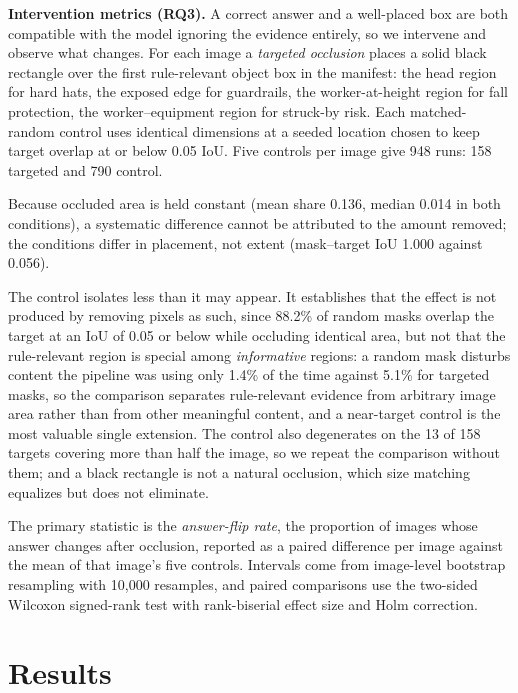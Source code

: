 \documentclass[12pt,letterpaper]{article}
\begin{document}
\label{sec:intervention}
\textbf{Intervention metrics (RQ3).} A correct answer and a well-placed box are both compatible with the model ignoring the evidence entirely, so we intervene and observe what changes. For each image a \textit{targeted occlusion} places a solid black rectangle over the first rule-relevant object box in the manifest: the head region for hard hats, the exposed edge for guardrails, the worker-at-height region for fall protection, the worker--equipment region for struck-by risk. Each matched-random control uses identical dimensions at a seeded location chosen to keep target overlap at or below 0.05 IoU. Five controls per image give 948 runs: 158 targeted and 790 control.

Because occluded area is held constant (mean share 0.136, median 0.014 in both conditions), a systematic difference cannot be attributed to the amount removed; the conditions differ in placement, not extent (mask--target IoU 1.000 against 0.056).

The control isolates less than it may appear. It establishes that the effect is not produced by removing pixels as such, since 88.2\% of random masks overlap the target at an IoU of 0.05 or below while occluding identical area, but not that the rule-relevant region is special among \textit{informative} regions: a random mask disturbs content the pipeline was using only 1.4\% of the time against 5.1\% for targeted masks, so the comparison separates rule-relevant evidence from arbitrary image area rather than from other meaningful content, and a near-target control is the most valuable single extension. The control also degenerates on the 13 of 158 targets covering more than half the image, so we repeat the comparison without them; and a black rectangle is not a natural occlusion, which size matching equalizes but does not eliminate.

The primary statistic is the \textit{answer-flip rate}, the proportion of images whose answer changes after occlusion, reported as a paired difference per image against the mean of that image's five controls. Intervals come from image-level bootstrap resampling with 10{,}000 resamples, and paired comparisons use the two-sided Wilcoxon signed-rank test with rank-biserial effect size and Holm correction.

\section{Results}
\label{sec:results}
\end{document}
